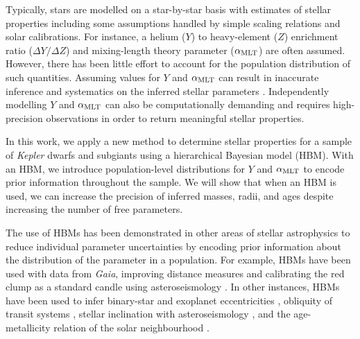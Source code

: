 Typically, stars are modelled on a star-by-star basis with estimates of stellar properties including some assumptions handled by simple scaling relations and solar calibrations. For instance, a helium ($Y$) to heavy-element ($Z$) enrichment ratio ($\Delta Y / \Delta Z$) and mixing-length theory parameter (${\alpha_\mathrm{MLT}}$) are often assumed. However, there has been little effort to account for the population distribution of such quantities. Assuming values for $Y$ and ${\alpha_\mathrm{MLT}}$ can result in inaccurate inference and systematics on the inferred stellar parameters \citep{Valle.DellOmodarme.ea2015}. Independently modelling $Y$ and ${\alpha_\mathrm{MLT}}$ can also be computationally demanding and requires high-precision observations in order to return meaningful stellar properties.

In this work, we apply a new method to determine stellar properties for a sample of \emph{Kepler} dwarfs and subgiants using a hierarchical Bayesian model (HBM). With an HBM, we introduce population-level distributions for $Y$ and ${\alpha_\mathrm{MLT}}$ to encode prior information throughout the sample. We will show that when an HBM is used, we can increase the precision of inferred masses, radii, and ages despite increasing the number of free parameters.

The use of HBMs has been demonstrated in other areas of stellar astrophysics to reduce individual parameter uncertainties by encoding prior information about the distribution of the parameter in a population. For example, HBMs have been used with data from \emph{Gaia}, improving distance measures \citep{Leistedt.Hogg2017, Anderson.Hogg.ea2018} and calibrating the red clump as a standard candle \citep{Hawkins.Leistedt.ea2017, Chan.Bovy2020} using asteroseismology \citep{Hall.Davies.ea2019}. In other instances, HBMs have been used to infer binary-star and exoplanet eccentricities \citep{Hogg.Myers.ea2010}, obliquity of transit systems \citep{Morton.Winn2014}, stellar inclination with asteroseismology \citep{Campante.Lund.ea2016, Kuszlewicz.Chaplin.ea2019}, and the age-metallicity relation of the solar neighbourhood \citep{Feuillet.Bovy.ea2016}.


